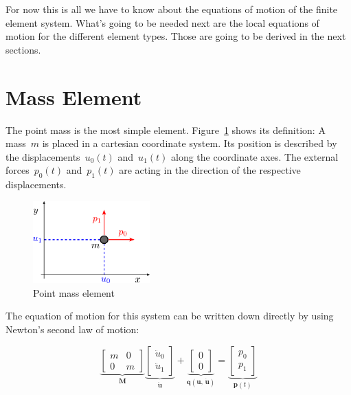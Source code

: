 For now this is all we have to know about the equations of motion of the finite element system.
What's going to be needed next are the local equations of motion for the different element types.
Those are going to be derived in the next sections.

\newpage
\section{Mass Element}

The point mass is the most simple element.
Figure~\ref{fig:elements:point-mass} shows its definition: A mass~$m$ is placed in a cartesian coordinate system. Its position is described by the displacements~$u_0(t)$ and~$u_1(t)$ along the coordinate axes.
The external forces~$p_0(t)$ and~$p_1(t)$ are acting in the direction of the respective displacements.

\begin{figure}[h]
\centering
\includegraphics[width=0.4\textwidth]{figures/elements/mass-element}
\caption{Point mass element}
\label{fig:elements:point-mass}
\end{figure}

The equation of motion for this system can be written down directly by using Newton's second law of motion:

\begin{equation}
\underbrace{
\begin{bmatrix}
m & 0\\
0 & m
\end{bmatrix}
}_{\boldsymbol{M}}
\underbrace{
\begin{bmatrix}
\ddot{u}_0\\
\ddot{u}_1
\end{bmatrix}
}_{\boldsymbol{\ddot{u}}}
+
\underbrace{
\begin{bmatrix}
0\\
0
\end{bmatrix}
}_{\boldsymbol{q}(\boldsymbol{u},\,\dot{\boldsymbol{u}})}
=
\underbrace{
\begin{bmatrix}
p_0\\
p_1
\end{bmatrix}
}_{\boldsymbol{p}(t)}
\end{equation}

